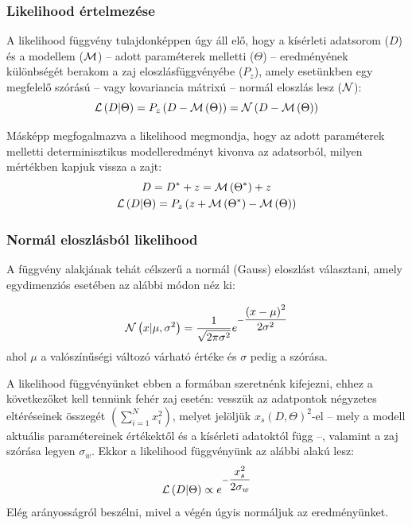 \subsubsection{Likelihood értelmezése}
A likelihood függvény tulajdonképpen úgy áll elő, hogy a kísérleti adatsorom ($D$) és a modellem ($\mathcal{M}$) -- adott paraméterek melletti ($\Theta$) -- eredményének különbségét berakom a zaj eloszlásfüggvényébe ($P_z$), amely esetünkben egy megfelelő szórású -- vagy kovariancia mátrixú -- normál eloszlás lesz ($\mathcal{N}$):
\begin{equation}
\mathcal{L}\left(D|\Theta\right) = P_z\left(D-\mathcal{M}\left(\Theta\right)\right) = \mathcal{N}\left(D-\mathcal{M}\left(\Theta\right)\right)
\end{equation} 

Másképp megfogalmazva a likelihood megmondja, hogy az adott paraméterek melletti determinisztikus modelleredményt kivonva az adatsorból, milyen mértékben kapjuk vissza a zajt:
\begin{gather}
	D = D^* + z = \mathcal{M}\left(\Theta^*\right) + z \\
	\mathcal{L}\left(D|\Theta\right) = P_z\left(z + \mathcal{M}\left(\Theta^*\right) -\mathcal{M}\left(\Theta\right)\right)
\end{gather}

\subsubsection{Normál eloszlásból likelihood}
A függvény alakjának tehát célszerű a normál (Gauss) eloszlást választani, amely egydimenziós esetében az alábbi módon néz ki:

\begin{equation}\label{eq:gauss}
	\mathcal{N}\left(x|\mu, \sigma^2\right) = \dfrac{1}{\sqrt{2\pi \sigma^2}}e^{-\dfrac{\left(x-\mu\right)^2}{2\sigma^2}}
\end{equation}
ahol $\mu$ a valószínűségi változó várható értéke és $\sigma$ pedig a szórása.

A likelihood függvényünket ebben a formában szeretnénk kifejezni, ehhez a következőket kell tennünk fehér zaj esetén: vesszük az adatpontok négyzetes eltéréseinek összegét $\left(\sum_{i=1}^{N}x_i^2\right)$, melyet jelöljük $x_s(D,\Theta)^2$-el -- mely a modell aktuális paramétereinek értékektől és a kísérleti adatoktól függ --, valamint a zaj szórása legyen $\sigma_w$. Ekkor a likelihood függvényünk az alábbi alakú lesz:
\begin{equation}\label{eq:likelihood}
	\mathcal{L}\left(D|\Theta\right)  \propto e^{-\dfrac{x_s^2}{2\sigma_w}}
\end{equation}
Elég arányosságról beszélni, mivel a végén úgyis normáljuk az eredményünket.


